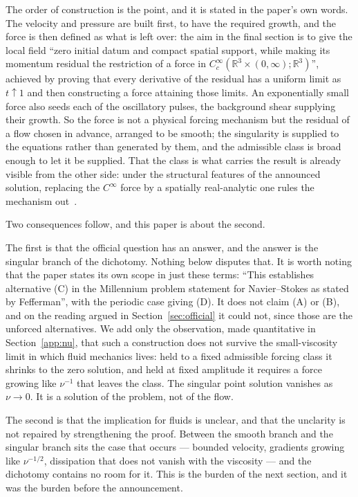\documentclass[11pt]{article}
\begin{document}
The order of construction is the point, and it is stated in the paper's own words. The velocity and
pressure are built first, to have the required growth, and the force is then defined as what is left
over: the aim in the final section is to give the local field ``zero initial datum and compact spatial
support, while making its momentum residual the restriction of a force in
$C^\infty_c(\mathbb{R}^3\times(0,\infty);\mathbb{R}^3)$'', achieved by proving that every derivative
of the residual has a uniform limit as $t\uparrow1$ and then constructing a force attaining those
limits. An exponentially small force also seeds each of the oscillatory pulses, the background shear
supplying their growth. So the force is not a physical forcing mechanism but the residual of a flow
chosen in advance, arranged to be smooth; the singularity is supplied to the equations rather than
generated by them, and the admissible class is broad enough to let it be supplied. That the class is what carries the result is already visible from
the other side: under the structural features of the announced solution, replacing the $C^\infty$
force by a spatially real-analytic one rules the mechanism out~\cite{civ}.

Two consequences follow, and this paper is about the second.

The first is that the official question has an answer, and the answer is the singular branch of the
dichotomy. Nothing below disputes that. It is worth noting that the paper states its own scope in just
these terms: ``This establishes alternative (C) in the Millennium problem statement for
Navier--Stokes as stated by Fefferman'', with the periodic case giving (D). It does not claim (A) or
(B), and on the reading argued in Section~\ref{sec:official} it could not, since those are the
unforced alternatives. We add only the observation, made quantitative in
Section~\ref{app:nu}, that such a construction does not survive the small-viscosity limit in which
fluid mechanics lives: held to a fixed admissible forcing class it shrinks to the zero solution,
and held at fixed amplitude it requires a force growing like $\nu^{-1}$ that leaves the class. The
singular point solution vanishes as $\nu\to0$. It is a solution of the problem, not of the flow.

The second is that the implication for fluids is unclear, and that the unclarity is not repaired by
strengthening the proof. Between the smooth branch and the singular branch sits the case that
occurs --- bounded velocity, gradients growing like $\nu^{-1/2}$, dissipation that does not vanish
with the viscosity --- and the dichotomy contains no room for it. This is the burden of the next
section, and it was the burden before the announcement.
\end{document}
